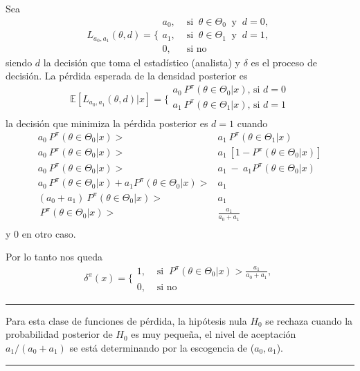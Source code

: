 \documentclass[12pt,]{article}
\begin{document}
Sea \[
L_{a_0,a_1}(\theta,d)= \Bigg \{
\begin{array}{ll}
a_0, &\text{ si }\ \theta\in\Theta_0\ \text{ y }\ d=0,\\
a_1, &\text{ si }\ \theta\in\Theta_1\ \text{ y }\ d=1,\\
0,&\text{ si no }
\end{array}
\] siendo \(d\) la decisión que toma el estadístico (analista) y
\(\delta\) es el proceso de decisión. La pérdida esperada de la densidad
posterior es \[
\mathbb{E}[L_{a_0,a_1}(\theta,d)|x] = \bigg\{
\begin{array}{rl}
a_0\ P^\pi(\theta\in\Theta_0|x)\text{, si } d=0\\
a_1\ P^\pi(\theta\in\Theta_1|x)\text{, si } d=1\\
\end{array}
\] la decisión que minimiza la pérdida posterior es \(d=1\) cuando \[
\begin{array}{rl}
a_0\ P^\pi(\theta\in\Theta_0|x) > & a_1\ P^\pi(\theta\in\Theta_1|x) \\
a_0\ P^\pi(\theta\in\Theta_0|x) > & a_1\ [1-P^\pi(\theta\in\Theta_0|x)]\\
a_0\ P^\pi(\theta\in\Theta_0|x) > & a_1\ -\ a_1P^\pi(\theta\in\Theta_0|x)\\
a_0\ P^\pi(\theta\in\Theta_0|x) + a_1P^\pi(\theta\in\Theta_0|x) > & a_1\ \\
(a_0+a_1)\ P^\pi(\theta\in\Theta_0|x) > & a_1\ \\
\ P^\pi(\theta\in\Theta_0|x) > & \displaystyle\frac{a_1}{a_0+a_1}\ \\
\end{array}
\] y \(0\) en otro caso.

Por lo tanto nos queda \[
\delta^\pi(x)=\Bigg\{
\begin{array}{ll}
1, &\text{ si }\ P^\pi(\theta\in\Theta_0|x)>\displaystyle \frac{a_1}{a_0+a_1},\\
0,&\text{ si no }
\end{array}
\]

\begin{center}\rule{0.5\linewidth}{\linethickness}\end{center}

Para esta clase de funciones de pérdida, la hipótesis nula \(H_0\) se
rechaza cuando la probabilidad posterior de \(H_0\) es muy pequeña, el
nivel de aceptación \(a_1/(a_0+a_1)\) se está determinando por la
escogencia de (\(a_0,a_1\)).

\begin{center}\rule{0.5\linewidth}{\linethickness}\end{center}
\end{document}

